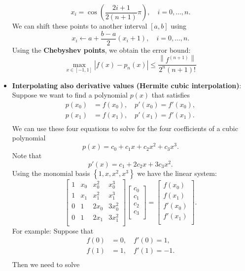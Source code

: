 \documentclass{report}
\begin{document}
\begin{itemize}
    $$x_i = \cos\left(\frac{2i+1}{2(n+1)}\pi\right), \quad i = 0,\ldots,n.$$
    We can shift these points to another interval $[a,b]$ using 
    $$x_i \gets a + \frac{b-a}{2}(x_i + 1), \quad i = 0,\ldots,n.$$
    Using the \textbf{Chebyshev points}, we obtain the error bound:
    $$\max_{x \in [-1,1]} \left|f(x) - p_n(x)\right| \leq \frac{\left\|f^{(n+1)}\right\|}{2^n(n+1)!}$$
\item \textbf{Interpolating also derivative values (Hermite cubic interpolation)}:
    Suppose we want to find a polynomial $p(x)$ that satisfies
    $$
    \begin{align}
        p(x_0) &= f(x_0), \quad p'(x_0) = f'(x_0),\\
        p(x_1) &= f(x_1), \quad p'(x_1) = f'(x_1).\\
    \end{align}
    $$
    We can use these four equations to solve for the four coefficients of a cubic polynomial
    $$p(x) = c_0 + c_1x + c_2x^2 + c_3x^3.$$
    Note that 
    $$p'(x) = c_1 + 2c_2x + 3c_3x^2.$$
    Using the monomial basis $\left\{1, x, x^2, x^3\right\}$ we have the linear system:
    $$
    \begin{bmatrix}
        1 & x_0 & x_0^2 &   x_0^3 \\
        1 & x_1 & x_1^2 &   x_1^3 \\
        0 &   1 & 2 x_0 & 3 x_0^2 \\
        0 &   1 & 2 x_1 & 3 x_1^2 \\
    \end{bmatrix}
    \begin{bmatrix}
        c_0\\c_1\\c_2\\c_3\\
    \end{bmatrix}
    =
    \begin{bmatrix}
        f(x_0)\\f(x_1)\\f'(x_0)\\f'(x_1)\\
    \end{bmatrix}.
    $$
    \bigbreak \noindent 
    For example: Suppose that 
    $$
    \begin{align}
        f(0) &= 0, \quad f'(0) =  1,\\
        f(1) &= 1, \quad f'(1) = -1.\\
    \end{align}
    $$
    Then we need to solve

\end{itemize}
\end{document}
